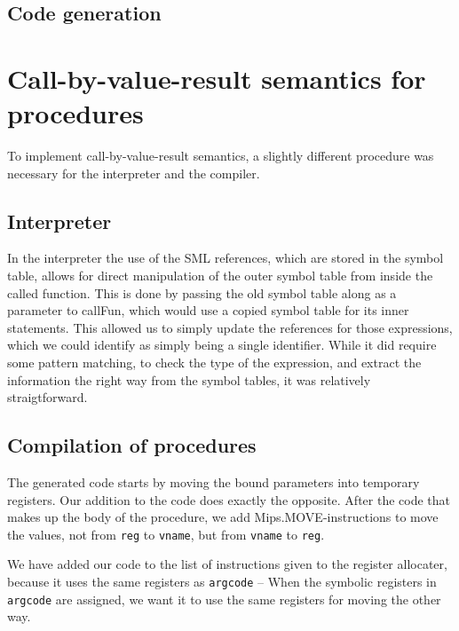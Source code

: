 \documentclass{article}
\begin{document}
\subsection{Code generation}

\section{Call-by-value-result semantics for procedures}
To implement call-by-value-result semantics, a slightly different procedure was necessary
for the interpreter and the compiler. 

\subsection{Interpreter}
In the interpreter the use of the SML references,
which are stored in the symbol table, allows for direct manipulation of the outer symbol table from inside the called function.
This is done by passing the old symbol table along as a parameter to callFun, which would use a copied symbol table for its inner statements.
This allowed us to simply update the references for those expressions, which we could identify as simply being a single identifier.
While it did require some pattern matching, to check the type of the expression, and extract the information the right way
from the symbol tables, it was relatively straigtforward.
\subsection{Compilation of procedures}
The generated code starts by moving the bound parameters into temporary registers. Our addition to the code
does exactly the opposite. After the code that makes up the body of the procedure, we add Mips.MOVE-instructions
to move the values, not from \texttt{reg} to \texttt{vname}, but from \texttt{vname} to \texttt{reg}.

We have added our code to the list of instructions given to the register allocater, because it uses the same
registers as \texttt{argcode} -- When the symbolic registers in \texttt{argcode} are assigned, we want it to
use the same registers for moving the other way.

\end{document}
